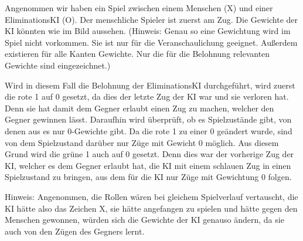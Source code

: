 \documentclass[titlepage]{scrartcl}
\begin{document}
Angenommen wir haben ein Spiel zwischen einem Menschen (X) und einer EliminationsKI (O). Der menschliche Spieler ist zuerst am Zug. Die Gewichte der KI könnten wie im Bild aussehen. (Hinweis: Genau so eine Gewichtung wird im Spiel nicht vorkommen. Sie ist nur für die Veranschaulichung geeignet. Außerdem existieren für alle Kanten Gewichte. Nur die für die Belohnung relevanten Gewichte sind eingezeichnet.) 

Wird in diesem Fall die Belohnung der EliminationsKI durchgeführt, wird zuerst die rote 1 auf 0 gesetzt, da dies der letzte Zug der KI war und sie verloren hat. Denn sie hat damit dem Gegner erlaubt einen Zug zu machen, welcher den Gegner gewinnen lässt.
Daraufhin wird überprüft, ob es Spielzustände gibt, von denen aus es nur 0-Gewichte gibt. Da die rote 1 zu einer 0 geändert wurde, sind von dem Spielzustand darüber nur Züge mit Gewicht 0 möglich. Aus diesem Grund wird die grüne 1 auch auf 0 gesetzt. Denn dies war der vorherige Zug der KI, welcher es dem Gegner erlaubt hat, die KI mit einem schlauen Zug in einen Spielzustand zu bringen, aus dem für die KI nur Züge mit Gewichtung 0 folgen. 

Hinweis: Angenommen, die Rollen wären bei gleichem Spielverlauf vertauscht, die KI hätte also das Zeichen X, sie hätte angefangen zu spielen und hätte gegen den Menschen gewonnen, würden sich die Gewichte der KI genauso ändern, da sie auch von den Zügen des Gegners lernt. 
\end{document}
